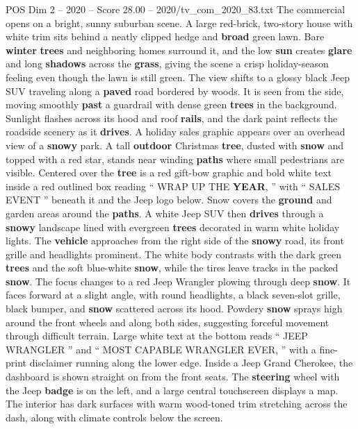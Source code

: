\begin{textsample}{POS Dim 2 – 2020 – Score 28.00 – 2020/tv\_com\_2020\_83.txt}  \label{ex:f2_pos_043}
The commercial opens on a bright, sunny suburban scene.
A large red-brick, two-story house with white trim sits behind a neatly clipped hedge and \textbf{broad} green lawn.
Bare \textbf{winter} \textbf{trees} and neighboring homes surround it, and the low \textbf{sun} creates \textbf{glare} and long \textbf{shadows} across the \textbf{grass}, giving the scene a crisp holiday-season feeling even though the lawn is still green.
The view shifts to a glossy black Jeep SUV traveling along a \textbf{paved} road bordered by woods.
It is seen from the side, moving smoothly \textbf{past} a guardrail with dense green \textbf{trees} in the background.
Sunlight flashes across its hood and roof \textbf{rails}, and the dark paint reflects the roadside scenery as it \textbf{drives}.
A holiday sales graphic appears over an overhead view of a \textbf{snowy} park.
A tall \textbf{outdoor} Christmas \textbf{tree}, dusted with \textbf{snow} and topped with a red star, stands near winding \textbf{paths} where small pedestrians are visible.
Centered over the \textbf{tree} is a red gift-bow graphic and bold white text inside a red outlined box reading “ WRAP UP THE \textbf{YEAR}, ” with “ SALES EVENT ” beneath it and the Jeep logo below.
Snow covers the \textbf{ground} and garden areas around the \textbf{paths}.
A white Jeep SUV then \textbf{drives} through a \textbf{snowy} landscape lined with evergreen \textbf{trees} decorated in warm white holiday lights.
The \textbf{vehicle} approaches from the right side of the \textbf{snowy} road, its front grille and headlights prominent.
The white body contrasts with the dark green \textbf{trees} and the soft blue-white \textbf{snow}, while the tires leave tracks in the packed \textbf{snow}.
The focus changes to a red Jeep Wrangler plowing through deep \textbf{snow}.
It faces forward at a slight angle, with round headlights, a black seven-slot grille, black bumper, and \textbf{snow} scattered across its hood.
Powdery \textbf{snow} sprays high around the front wheels and along both sides, suggesting forceful movement through difficult terrain.
Large white text at the bottom reads “ JEEP WRANGLER ” and “ MOST CAPABLE WRANGLER EVER, ” with a fine-print disclaimer running along the lower edge.
Inside a Jeep Grand Cherokee, the dashboard is shown straight on from the front seats.
The \textbf{steering} wheel with the Jeep \textbf{badge} is on the left, and a large central touchscreen displays a map.
The interior has dark surfaces with warm wood-toned trim stretching across the dash, along with climate controls below the screen.

\end{textsample}
